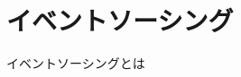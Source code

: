 \documentclass[../../../main]{subfiles}
\begin{document}
    \section{イベントソーシング}\label{sec:phraseology-event_sourcing}

    イベントソーシングとは
\end{document}
